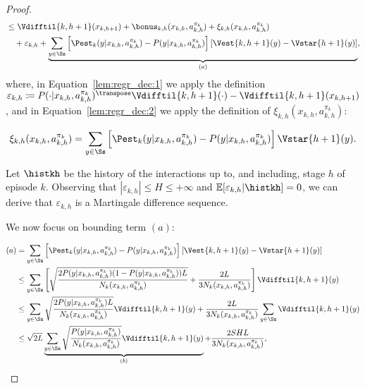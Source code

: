 \begin{proof}
\begin{align}
    \begin{split} \label{lem:regr_dec:2}
    &\le \Vdifftil{k,h+1}(x_{k,h+1}) + \bonus_{k,h}(x_{k,h}, a_{k,h}^{\pi_k}) + 
    \xi_{k,h}(x_{k,h}, a_{k,h}^{\pi_k}) \\
    &\quad + \varepsilon_{k,h} + \underbrace{\sum_{y \in \Ss} \left[ \Pest_k (y | x_{k,h}, a_{k,h}^{\pi_k}) - P(y | x_{k,h}, a_{k,h}^{\pi_k}) \right] \left[ \Vest{k, h+1}(y) - \Vstar{h+1}(y) \right]}_{(a)},
    \end{split}
\end{align}
where, in Equation~\eqref{lem:regr_dec:1} we apply the definition $\varepsilon_{k,h} \coloneqq P(\cdot | x_{k,h}, a_{k,h}^{\pi_k})^\transpose \Vdifftil{k,h+1}(\cdot) - \Vdifftil{k,h+1}(x_{k,h+1})$, and in Equation~\eqref{lem:regr_dec:2} we apply the definition of $\xi_{k,h}(x_{k,h}, a_{k,h}^{\pi_k})$:

\begin{equation*}
    \xi_{k,h}(x_{k,h}, a_{k,h}^{\pi_k}) = \sum_{y \in \Ss} \left[ \Pest_k (y | x_{k,h}, a_{k,h}^{\pi_k}) - P(y | x_{k,h}, a_{k,h}^{\pi_k}) \right] \Vstar{h+1} (y).
\end{equation*}

Let $\histkh$ be the history of the interactions up to, and including, stage $h$ of episode $k$. Observing that $| \varepsilon_{k,h} | \le H \le + \infty$ and $\mathbb{E}[\varepsilon_{k,h} | \histkh]=0$, we can derive that $\varepsilon_{k,h}$ is a Martingale difference sequence.

We now focus on bounding term $(a)$:

\begin{align}
    (a) &= \sum_{y \in \Ss} \left[ \Pest_k (y | x_{k,h}, a_{k,h}^{\pi_k}) - P(y | x_{k,h}, a_{k,h}^{\pi_k}) \right]\left[ \Vest{k,h+1}(y) - \Vstar{h+1}(y) \right] \nonumber \\
    &\le \sum_{y \in \Ss} \left[ \sqrt{\frac{2 P(y|x_{k,h},a_{k,h}^{\pi_k})(1-P(y|x_{k,h},a_{k,h}^{\pi_k})) L}{N_k(x_{k,h}, a_{k,h}^{\pi_k})}} + \frac{2L}{3 N_k (x_{k,h}, a_{k,h}^{\pi_k})} \right] \Vdifftil{k,h+1}(y) \label{lem:regr_dec:3} \\
    &\le \sum_{y \in \Ss}\sqrt{\frac{2 P(y|x_{k,h},a_{k,h}^{\pi_k})L}{N_k(x_{k,h}, a_{k,h}^{\pi_k})}} \Vdifftil{k,h+1}(y) + \frac{2L}{3N_k(x_{k,h}, a_{k,h}^{\pi_k})} \sum_{y \in \Ss} \Vdifftil{k,h+1}(y) \label{lem:regr_dec:4} \\
    &\le \sqrt{2L} \underbrace{\sum_{y \in \Ss}\sqrt{\frac{P(y|x_{k,h},a_{k,h}^{\pi_k})}{N_k(x_{k,h}, a_{k,h}^{\pi_k})}} \Vdifftil{k,h+1}(y)}_{(b)} + \frac{2SHL}{3N_k(x_{k,h},a_{k,h}^{\pi_k})} \label{lem:regr_dec:5},
\end{align}


\end{proof}
